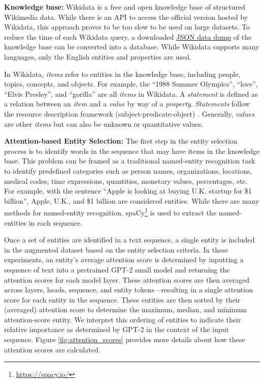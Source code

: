 \documentclass[phd,electronic,oneside,twosidetoc,letterpaper,chaptercenter,parttop,lof]{byumsphd}
\begin{document}
\textbf{Knowledge base:}
Wikidata \cite{vrandecic2014wikidata} is a free and open knowledge base of structured \cite{cafarella2011structureddata} Wikimedia data.
While there is an API to access the official version hosted by Wikidata, this approach proves to be too slow to be used on large datasets.
To reduce the time of each Wikidata query, a downloaded \href{https://dumps.wikimedia.org/wikidatawiki/entities/}{JSON data dump} of the knowledge base can be converted into a database. 
While Wikidata supports many languages, only the English entities and properties are used. 

In Wikidata, \emph{items} refer to entities in the knowledge base, including people, topics, concepts, and objects. 
For example, the ``1988 Summer Olympics'', ``love'', ``Elvis Presley'', and ``gorilla'' are all \emph{items} in Wikidata.
A \emph{statement} is defined as a relation between an \emph{item} and a \emph{value} by way of a \emph{property}. 
\emph{Statements} follow the resource description framework (subject-predicate-object) \cite{miller1998rdf}.
Generally, \emph{values} are other \emph{items} but can also be unknown or quantitative values. 

\textbf{Attention-based Entity Selection:}
The first step in the entity selection process is to identify words in the sequence that may have items in the knowledge base. This problem can be framed as a traditional named-entity recognition task to identify predefined categories such as person names, organizations, locations, medical codes, time expressions, quantities, monetary values, percentages, etc.  For example, with the sentence ``Apple is looking at buying U.K. startup for \$1 billion'', Apple, U.K., and \$1 billion are considered entities. While there are many methods for named-entity recognition, spaCy\footnote{\url{https://spacy.io/}} is used to extract the named-entities in each sequence. 

Once a set of entities are identified in a text sequence, a single entity is included in the augmented dataset based on the entity selection criteria. 
In these experiments, an entity's average attention score is determined by inputting a sequence of text into a pretrained GPT-2 small model and returning the attention scores for each model layer.
These attention scores are then averaged across layers, heads, sequence, and entity tokens---resulting in a single attention score for each entity in the sequence.
These entities are then sorted by their (averaged) attention score to determine the maximum, median, and minimum attention-score entity.
We interpret this ordering of entities to indicate their relative importance as determined by GPT-2 in the context of the input sequence.
Figure \ref{fig:attention_scores} provides more details about how these attention scores are calculated.
\end{document}
